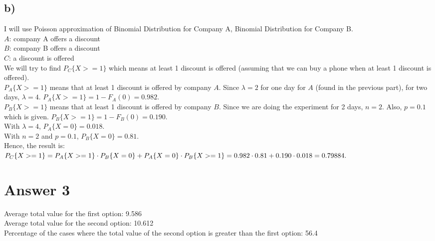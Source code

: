 \documentclass[12pt]{article}
\begin{document}
\subsection*{b)}
I will use Poisson approximation of Binomial Distribution for Company A, Binomial Distribution for Company B.\vspace{0.1cm}\\
$A$: company A offers a discount\\
$B$: company B offers a discount\\
$C$: a discount is offered\vspace{0.1cm}\\
We will try to find $P_C\{X>=1\}$ which means at least 1 discount is offered (assuming that we can buy a phone when at least 1 discount is offered).\vspace{0.1cm}\\
$ P_A\{X>=1\} $ means that at least 1 discount is offered by company $A$. Since $\lambda = 2$ for one day for $A$ (found in the previous part), for two days, $\lambda = 4$. $ P_A\{X>=1\} = 1 - F_A(0) = 0.982. $\vspace{0.1cm}\\
$ P_B\{X>=1\} $ means that at least 1 discount is offered by company $B$. Since we are doing the experiment for 2 days, $n=2.$ Also, $p=0.1$ which is given. $ P_B\{X>=1\} = 1 - F_B(0) = 0.190. $\vspace{0.1cm}\\
With $\lambda = 4$, $ P_A\{X=0\} = 0.018. $\vspace{0.1cm}\\
With $n=2$ and $p=0.1$, $ P_B\{X=0\} = 0.81. $\vspace{0.1cm}\\
Hence, the result is:\\
$P_C\{X>=1\} = P_A\{X>=1\} \cdot P_B\{X=0\} + P_A\{X=0\} \cdot P_B\{X>=1\} \\ = 0.982 \cdot 0.81 + 0.190 \cdot 0.018 = 0.79884. $
\section*{Answer 3}
Average total value for the first option: 9.586\\
Average total value for the second option: 10.612\\
Percentage of the cases where the total value of the second option is greater than the first option: 56.4
\end{document}
